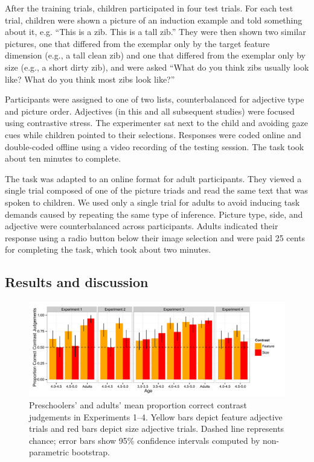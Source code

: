 \documentclass[man]{apa2}
\begin{document}
After the training trials, children participated in four test trials.  For each test trial, children were shown a picture of an induction example and told something about it, e.g. ``This is a zib. This is a tall zib.''  They were then shown two similar pictures, one that differed from the exemplar only by the target feature dimension (e.g., a tall clean zib) and one that differed from the exemplar only by size (e.g., a short dirty zib), and were asked ``What do you think zibs usually look like?  What do you think most zibs look like?'' 

Participants were assigned to one of two lists, counterbalanced for adjective type and picture order.  Adjectives (in this and all subsequent studies) were focused using contrastive stress. The experimenter sat next to the child and avoiding gaze cues while children pointed to their selections.  Responses were coded online and double-coded offline using a video recording of the testing session.  The task took about ten minutes to complete. 

The task was adapted to an online format for adult participants. They viewed a single trial composed of one of the picture triads and read the same text that was spoken to children. We used only a single trial for adults to avoid inducing task demands caused by repeating the same type of inference. Picture type, side, and adjective were counterbalanced across participants.  Adults indicated their response using a radio button below their image selection and were paid 25 cents for completing the task, which took about two minutes. 

\subsection{Results and discussion}

\begin{figure}[t] 
  \begin{center} 
    \includegraphics[width=6.5in]{figures/experimentsReorder.pdf} 
    \caption{\label{fig:experiments1thru4} Preschoolers' and adults' mean proportion correct contrast judgements in Experiments 1--4.     
  Yellow bars depict feature adjective trials and red bars depict size adjective trials. Dashed line represents chance; error bars show 95\% confidence intervals computed by non-parametric bootstrap.}
  \end{center} 
  \vspace{-10ex} 
\end{figure}
\end{document}
